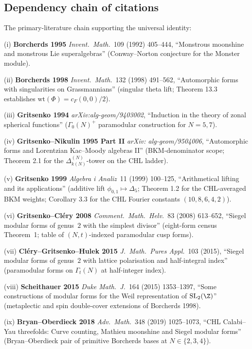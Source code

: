 \subsection*{Dependency chain of citations}

The primary-literature chain supporting the universal identity:

(i) \textbf{Borcherds 1995} \emph{Invent.\ Math.}~109 (1992)
405--444, ``Monstrous moonshine and monstrous Lie superalgebras''
(Conway--Norton conjecture for the Monster module).

(ii) \textbf{Borcherds 1998} \emph{Invent.\ Math.}~132 (1998)
491--562, ``Automorphic forms with singularities on Grassmannians''
(singular theta lift; Theorem 13.3 establishes
$\mathrm{wt}(\Phi) = c_F(0, 0)/2$).

(iii) \textbf{Gritsenko 1994} \emph{arXiv:alg-geom/9403002},
``Induction in the theory of zonal spherical functions''
($\Gamma_0(N)^+$ paramodular construction for $N = 5, 7$).

(iv) \textbf{Gritsenko--Nikulin 1995 Part II} \emph{arXiv:
alg-geom/9504006}, ``Automorphic forms and Lorentzian Kac--Moody
algebras II'' (BKM-denominator scope; Theorem 2.1 for the
$\Delta_{k(N)}^{(N)}$-tower on the CHL ladder).

(v) \textbf{Gritsenko 1999} \emph{Algebra i Analiz}~11 (1999)
100--125, ``Arithmetical lifting and its applications'' (additive
lift $\phi_{0, 1} \mapsto \Delta_5$; Theorem 1.2 for the
CHL-averaged BKM weights; Corollary 3.3 for the CHL Fourier
constants $(10, 8, 6, 4, 2)$).

(vi) \textbf{Gritsenko--Cl\'ery 2008} \emph{Comment.\ Math.\
Helv.}~83 (2008) 613--652, ``Siegel modular forms of genus~$2$ with
the simplest divisor'' (eight-form census Theorem~1; table of
$(N, t)$-indexed paramodular cusp forms).

(vii) \textbf{Cl\'ery--Gritsenko--Hulek 2015} \emph{J.\ Math.\
Pures Appl.}~103 (2015), ``Siegel modular forms of genus~$2$ with
lattice polarisation and half-integral index'' (paramodular forms
on $\Gamma_t(N)$ at half-integer index).

(viii) \textbf{Scheithauer 2015} \emph{Duke Math.\ J.}~164 (2015)
1353--1397, ``Some constructions of modular forms for the Weil
representation of $\mathrm{SL}_2(\Z)$'' (metaplectic and spin
double-cover extensions of Borcherds 1998).

(ix) \textbf{Bryan--Oberdieck 2018} \emph{Adv.\ Math.}~348 (2019)
1025--1073, ``CHL Calabi--Yau threefolds: Curve counting,
Mathieu moonshine and Siegel modular forms'' (Bryan--Oberdieck
pair of primitive Borcherds bases at $N \in \{2, 3, 4\}$).

